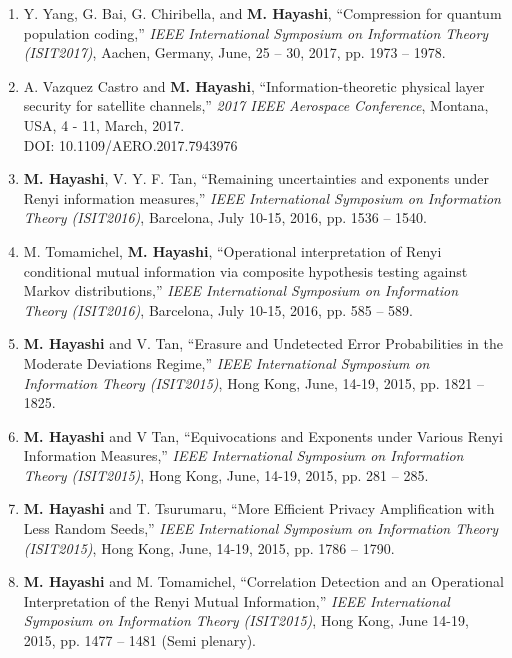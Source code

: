 \documentclass[a4paper,12pt,oneside]{article}
\begin{document}
\begin{enumerate}
    \item
    Y. Yang, G. Bai, G. Chiribella, and \textbf{M. Hayashi},
    ``Compression for quantum population coding,''
    {\em IEEE International Symposium on Information Theory (ISIT2017)}, 
    Aachen, Germany, June, 25 -- 30, 2017, pp. 1973 -- 1978.
    
    \item
    A. Vazquez Castro and \textbf{M. Hayashi}, ``Information-theoretic physical layer security for satellite channels,'' 
    {\em 2017 IEEE Aerospace Conference}, Montana, USA, 4 - 11, March, 2017.\\
    DOI: 10.1109/AERO.2017.7943976
    
    \item
    \textbf{M. Hayashi}, V. Y. F. Tan, ``Remaining uncertainties and exponents under Renyi information measures,'' 
    {\em IEEE International Symposium on Information Theory (ISIT2016)}, 
    Barcelona, July 10-15, 2016, pp. 1536 -- 1540.
    
    \item
    M. Tomamichel, \textbf{M. Hayashi}, ``Operational interpretation of Renyi conditional mutual information via composite hypothesis testing against Markov distributions,'' 
    {\em IEEE International Symposium on Information Theory (ISIT2016)}, 
    Barcelona, July 10-15, 2016, pp. 585 -- 589.
    
    \item
    \textbf{M. Hayashi} and V. Tan, 
    ``Erasure and Undetected Error Probabilities in the Moderate Deviations Regime,'' 
    {\em IEEE International Symposium on Information Theory (ISIT2015)},
    Hong Kong, June, 14-19, 2015, pp. 1821 -- 1825.
    
    \item
    \textbf{M. Hayashi} and V Tan, 
    ``Equivocations and Exponents under Various Renyi Information Measures,'' 
    {\em IEEE International Symposium on Information Theory (ISIT2015)},
    Hong Kong, June, 14-19, 2015, pp. 281 -- 285.
    
    \item
    \textbf{M. Hayashi} and T. Tsurumaru, 
    ``More Efficient Privacy Amplification with Less Random Seeds,'' 
    {\em IEEE International Symposium on Information Theory (ISIT2015)},
    Hong Kong, June, 14-19, 2015, pp. 1786 -- 1790.
    
    \item
    \textbf{M. Hayashi} and M. Tomamichel, 
    ``Correlation Detection and an Operational Interpretation of the Renyi Mutual Information,'' 
    {\em IEEE International Symposium on Information Theory (ISIT2015)},
    Hong Kong, June 14-19, 2015, pp. 1477 -- 1481 (Semi plenary).
    

\end{enumerate}
\end{document}
